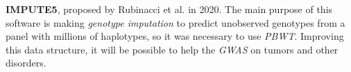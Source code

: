 \documentclass[a4paper,11pt, oneside]{article}
\begin{document}
\textbf{IMPUTE5}, proposed by Rubinacci et al. in 2020. The main purpose of this
software is making \textit{genotype imputation} to predict unobserved
genotypes from a panel with millions of haplotypes, so it was necessary to use
\textit{PBWT}. Improving this data structure, it will be possible to help the
\textit{GWAS} on tumors and other disorders. 
\end{document}

